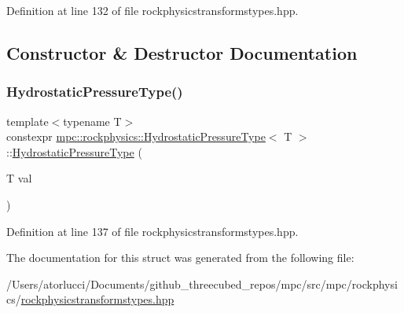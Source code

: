 Definition at line 132 of file rockphysicstransformstypes.\+hpp.



\subsection{Constructor \& Destructor Documentation}
\mbox{\label{structmpc_1_1rockphysics_1_1_hydrostatic_pressure_type_a182e96fb2534e9a66ca8f1a600c0fd0d}} 
\subsubsection{\texorpdfstring{Hydrostatic\+Pressure\+Type()}{HydrostaticPressureType()}}
{\footnotesize\ttfamily template$<$typename T$>$ \\
constexpr \mbox{\hyperlink{structmpc_1_1rockphysics_1_1_hydrostatic_pressure_type}{mpc\+::rockphysics\+::\+Hydrostatic\+Pressure\+Type}}$<$ T $>$\+::\mbox{\hyperlink{structmpc_1_1rockphysics_1_1_hydrostatic_pressure_type}{Hydrostatic\+Pressure\+Type}} (\begin{DoxyParamCaption}\item[{T}]{val }\end{DoxyParamCaption})\hspace{0.3cm}{\ttfamily [inline]}}



Definition at line 137 of file rockphysicstransformstypes.\+hpp.



The documentation for this struct was generated from the following file\+:\begin{DoxyCompactItemize}
\item 
/\+Users/atorlucci/\+Documents/github\+\_\+threecubed\+\_\+repos/mpc/src/mpc/rockphysics/\mbox{\hyperlink{rockphysicstransformstypes_8hpp}{rockphysicstransformstypes.\+hpp}}\end{DoxyCompactItemize}
